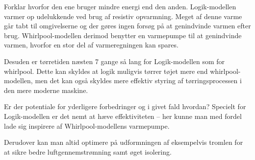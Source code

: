 \documentclass[a4paper]{article}
\begin{document}
 Forklar hvorfor den ene bruger mindre energi end den anden.
\bigbreak
Logik-modellen varmer op udelukkende ved brug af resistiv opvarmning. Meget af denne varme går tabt til omgivelserne og der gøres ingen forsøg på at genindvinde varmen efter brug. Whirlpool-modellen derimod benytter en varmepumpe til at genindvinde varmen, hvorfor en stor del af varmeregningen kan spares.

Desuden er tørretiden næsten 7 gange så lang for Logik-modellen som for whirlpool. Dette kan skyldes at logik muligvis tørrer tøjet mere end whirlpool-modellen, men det kan også skyldes mere effektiv styring af tørringsprocessen i den mere moderne maskine. 

 Er der potentiale for yderligere forbedringer og i givet fald hvordan?
\bigbreak
Specielt for Logik-modellen er det nemt at hæve effektiviteten -- her kunne man med fordel lade sig inspirere af Whirlpool-modellens varmepumpe. 

Derudover kan man altid optimere på udformningen af eksempelvis tromlen for at sikre bedre luftgennemstrømning samt øget isolering.
\end{document}
